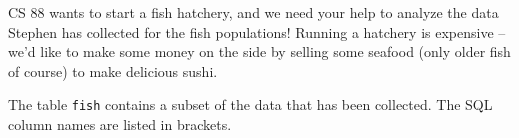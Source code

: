 CS 88 wants to start a fish hatchery, and we need your help to analyze the data Stephen has collected for the fish populations! Running a hatchery is expensive -- we'd like to make some money on the side by selling some seafood (only older fish of course) to make delicious sushi.

The table \lstinline$fish$ contains a subset of the data that has been collected. The SQL column names are listed in brackets.
